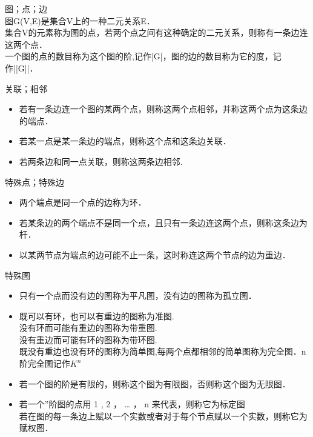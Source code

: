 \begin{issues}
\end{issues}
\begin{definition}{图；点；边}
\\图G(V,E)是集合V上的一种二元关系E．
\\集合V的元素称为图的点，若两个点之间有这种确定的二元关系，则称有一条边连这两个点．
\\一个图的点的数目称为这个图的阶,记作|G|，图的边的数目称为它的度，记作||G||．
\end{definition}
\begin{definition}{关联；相邻}
\begin{itemize}
\item 若有一条边连一个图的某两个点，则称这两个点相邻，并称这两个点为这条边的端点．
\item 若某一点是某一条边的端点，则称这个点和这条边关联．
\item 若两条边和同一点关联，则称这两条边相邻.
\end{itemize}
\end{definition}
\begin{definition}{特殊点；特殊边}
\begin{itemize}
\item 两个端点是同一个点的边称为环．
\item 若某条边的两个端点不是同一个点，且只有一条边连这两个点，则称这条边为杆．
\item 以某两节点为端点的边可能不止一条，这时称连这两个节点的边为重边．
\end{itemize}
\end{definition}
\begin{definition}{特殊图}
\begin{itemize}
\item 只有一个点而没有边的图称为平凡图，没有边的图称为孤立图．
\item 既可以有环，也可以有重边的图称为准图.
\\没有环而可能有重边的图称为带重图.
\\没有重边而可能有环的图称为带环图.
\\既没有重边也没有环的图称为简单图,每两个点都相邻的简单图称为完全图．n阶完全图记作$K^{n}$
\item 若一个图的阶是有限的，则称这个图为有限图，否则称这个图为无限图．
\item 若一个”阶图的点用 1 , 2 ， … ， n 来代表，则称它为标定图
\\若在图的每一条边上赋以一个实数或者对于每个节点赋以一个实数，则称它为赋权图．
\end{itemize}
\end{definition}

